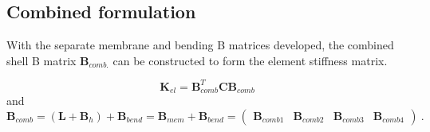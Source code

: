 \subsection{Combined formulation}

With the separate membrane and bending B matrices developed, the combined shell B matrix $\mathbf{B}_{comb.}$ can be constructed to form the element stiffness matrix.

\begin{equation} 
\mathbf{K}_{el} = \mathbf{B}_{comb}^T \mathbf{C} \mathbf{B}_{comb} 
\label{equation30}
\end{equation}
and
\begin{equation} 
\mathbf{B}_{comb} = (\mathbf{L} + \mathbf{B}_h) + \mathbf{B}_{bend} = \mathbf{B}_{mem} + \mathbf{B}_{bend} = 
\begin{pmatrix}
\mathbf{B}_{comb1} & \mathbf{B}_{comb2} & \mathbf{B}_{comb3} & \mathbf{B}_{comb4}
\end{pmatrix}
\label{equation31}\ .
\end{equation}

